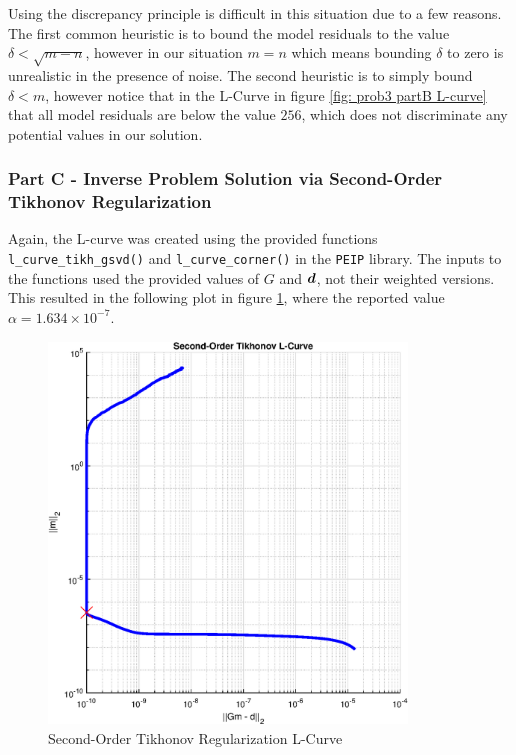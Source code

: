  Using the discrepancy principle is difficult in this situation due to a few reasons. The first common heuristic is to bound the model residuals to the value $\delta < \sqrt{m - n}$, however in our situation $m = n$ which means bounding $\delta$ to zero is unrealistic in the presence of noise. The second heuristic is to simply bound $\delta < m$, however notice that in the L-Curve in figure \ref{fig: prob3 partB L-curve} that all model residuals are below the value $256$, which does not discriminate any potential values in our solution.
 
 
 \subsubsection{Part C - Inverse Problem Solution via Second-Order Tikhonov Regularization}
 
  Again, the L-curve was created using the provided functions \verb*|l_curve_tikh_gsvd()| and \verb*|l_curve_corner()| in the \verb*|PEIP| library. The inputs to the functions used the provided values of $G$ and $\boldsymbol{d}$, not their weighted versions. This resulted in the following plot in figure \ref{fig: prob3 partC L-curve}, where the reported value $\alpha = 1.634 \times 10^{-7}$.
 
 \begin{figure}[h] 
 	\centering
 	\includegraphics[width=0.85\textwidth]{./images/prob3_partC_tikh_L_Curve.eps}
 	\caption{Second-Order Tikhonov Regularization L-Curve}
 	\label{fig: prob3 partC L-curve}
 \end{figure}
 \FloatBarrier
 
